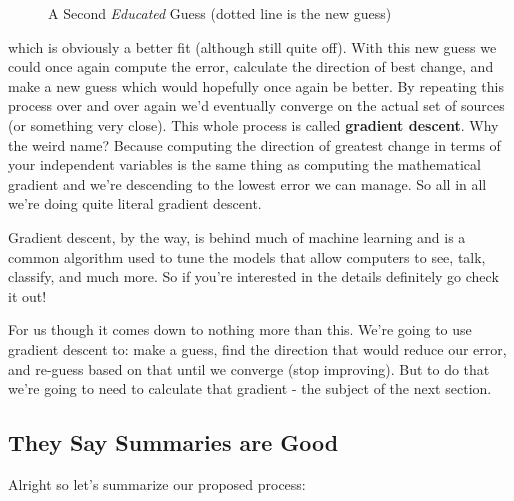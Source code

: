 \documentclass[10pt,a4paper]{article}
\begin{document}
\begin{figure}[!htb]
\caption{\label{fig:my-label} A Second \textit{Educated} Guess (dotted line is the new guess)}
\end{figure}

which is obviously a better fit (although still quite off). With this new guess we could once again compute the error, calculate the direction of best change, and make a new guess which would hopefully once again be better. By repeating this process over and over again we'd eventually converge on the actual set of sources (or something very close). This whole process is called \textbf{gradient descent}. Why the weird name? Because computing the direction of greatest change in terms of your independent variables is the same thing as computing the mathematical gradient and we're descending to the lowest error we can manage. So all in all we're doing quite literal gradient descent. 

Gradient descent, by the way, is behind much of machine learning and is a common algorithm used to tune the models that allow computers to see, talk, classify, and much more. So if you're interested in the details definitely go check it out!

For us though it comes down to nothing more than this. We're going to use gradient descent to: make a guess, find the direction that would reduce our error, and re-guess based on that until we converge (stop improving). But to do that we're going to need to calculate that gradient - the subject of the next section.

\subsection{They Say Summaries are Good}
Alright so let's summarize our proposed process:
\end{document}
